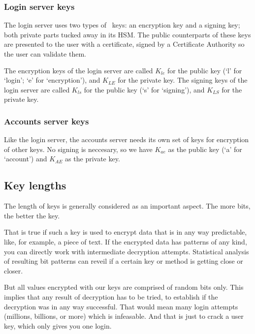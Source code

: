 \subsubsection{Login server keys}
The login server uses two types of \RSA\ keys:
an encryption key and a signing key; both private parts tucked away in its HSM.
The public counterparts of these keys are presented to the user with a certificate,
signed by a Certificate Authority so the user can validate them.
\par
The encryption keys of the login server are called $K_{le}$ for the public key
(`l' for `login'; `e' for `encryption'),
and $K_{LE}$ for the private key.
The signing keys of the login server are called $K_{ls}$ for the public key
(`s' for `signing'),
and $K_{LS}$ for the private key.
\subsubsection{Accounts server keys}
Like the login server, the accounts server needs its own set of keys for encryption of other keys.
No signing is neccesary,
so we have $K_{ae}$ as the public key
(`a' for `account')
and $K_{AE}$ as the private key.

\subsection{Key lengths}
\label{sec:key_length}
The length of keys is generally considered as an important aspect.
The more bits, the better the key.
\par
That is true if such a key is used to encrypt data that is in any way predictable,
like, for example, a piece of text.
If the encrypted data has patterns of any kind,
you can directly work with intermediate decryption attempts.
Statistical analysis of resulting bit patterns can reveil if a certain key or method is getting close or closer.
\par
But all values encrypted with our keys are comprised of random bits only.
This implies that any result of decryption has to be tried,
to establish if the decryption was in any way successful.
That would mean many login attempts
(millions, billions, or more)
which is infeasable.
And that is just to crack a user key,
which only gives you one login.

